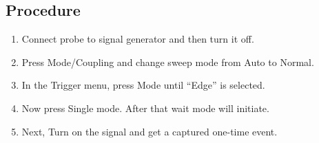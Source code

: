 \documentclass[a4paper,12pt]{article}
\begin{document}
\subsection{Procedure}
\begin{enumerate}
    \item Connect probe to signal generator and then turn it off.
    \item Press Mode/Coupling and change sweep mode from Auto to Normal.
    \item In the Trigger menu, press Mode until “Edge” is selected.
    \item Now press Single mode. After that wait mode will initiate.
    \item Next, Turn on the signal and get a captured one-time event.  
\end{enumerate}
\end{document}
